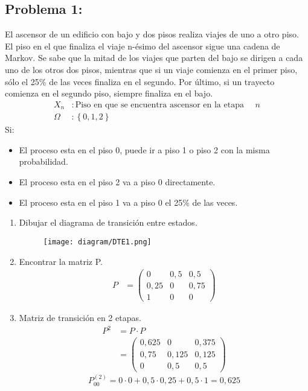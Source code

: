 \documentclass{templateNote}
\begin{document}
\subsection{Problema 1:}
El ascensor de un edificio con bajo y dos pisos realiza viajes de uno a otro piso. El piso en el que finaliza el viaje n-\'esimo del ascensor sigue una cadena de Markov. Se sabe que la mitad de los viajes que parten del bajo se dirigen a cada uno de los otros dos pisos, mientras que si un viaje comienza en el primer piso, s\'olo el 25\% de las veces finaliza en el segundo. Por \'ultimo, si un trayecto comienza en el segundo piso, siempre finaliza en el bajo.
\begin{align*}
    X_n &: \text{Piso en que se encuentra ascensor en la etapa } \quad n \\
    \Omega &: \left\{0, 1, 2\right\}
\end{align*}
Si:
\begin{itemize}
    \item El proceso esta en el piso 0, puede ir a piso 1 o piso 2 con la misma probabilidad.
    \item El proceso esta en el piso 2 va a piso 0 directamente.
    \item El proceso esta en el piso 1 va a piso 0 el 25\% de las veces.
\end{itemize}
\begin{enumerate}
    \item Dibujar el diagrama de transici\'on entre estados.
    \begin{figure}[H]
        \centering
        \texttt{[image: diagram/DTE1.png]}
    \end{figure}
    \item Encontrar la matriz P.
    \begin{align*}
        P &= \left(\begin{matrix}
            0 & 0,5 & 0,5 \\
            0,25 & 0 & 0,75 \\
            1 & 0 & 0
        \end{matrix} \right)
    \end{align*}

    \item Matriz de transici\'on en 2 etapas.
    \begin{align*}
        P^2 &= P \cdot P \\
        &= \left(\begin{matrix}
            0,625 & 0 & 0,375 \\
            0,75 & 0,125 & 0,125 \\
            0 & 0,5 & 0,5
        \end{matrix}\right)        
    \end{align*}
    \begin{equation*}
        P_{00}^{(2)} = 0 \cdot 0 + 0,5 \cdot 0,25 + 0,5 \cdot 1 = 0,625
    \end{equation*}
\end{enumerate}
\end{document}

